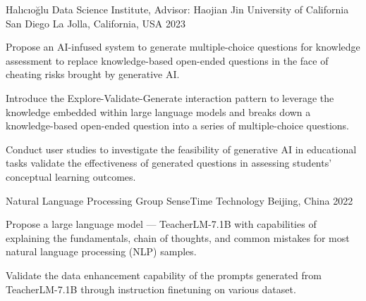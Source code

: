 

\begin{cventries}


  \cventry
    {Halıcıoğlu Data Science Institute, Advisor: Haojian Jin} %
    {University of California San Diego} %
    {La Jolla, California, USA} %
    {2023} %
    {
      \begin{cvitems}
        \item {Propose an AI-infused system to generate multiple-choice questions for knowledge assessment to replace knowledge-based open-ended questions in the face of cheating risks brought by generative AI.}
        \item {Introduce the Explore-Validate-Generate interaction pattern to leverage the knowledge embedded within large language models and breaks down a knowledge-based open-ended question into a series of multiple-choice questions.}
        \item {Conduct user studies to investigate the feasibility of generative AI in educational tasks validate the effectiveness of generated questions in assessing students' conceptual learning outcomes.}
      \end{cvitems}
    }
  
  \cventry
    {Natural Language Processing Group}
    {SenseTime Technology} 
    {Beijing, China} %
    {2022} %
    {
      \begin{cvitems} %
        \item Propose a large language model --- TeacherLM-7.1B with capabilities of explaining the fundamentals, chain of thoughts, and common mistakes for most natural language processing (NLP) samples.
        \item Validate the data enhancement capability of the prompts generated from TeacherLM-7.1B through instruction finetuning on various dataset.
      \end{cvitems}
    }


\end{cventries}
